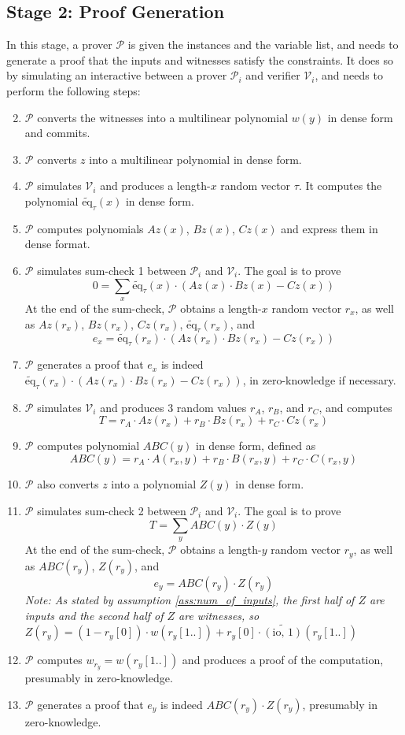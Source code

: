 \documentclass{article}
\renewcommand{\P}{\mathcal{P}}
\newcommand{\V}{\mathcal{V}}
\newcommand{\eq}{\widetilde{\mbox{eq}}}
\newcommand{\io}{\widetilde{(\mbox{io, 1})}}
\begin{document}
\subsection{Stage 2: Proof Generation}
In this stage, a prover $\P$ is given the instances and the variable list, and needs to generate a proof that the inputs and witnesses satisfy the constraints. It does so by simulating an interactive between a prover $\P_i$ and verifier $\V_i$, and needs to perform the following steps:
\begin{enumerate}
    \setcounter{enumi}{1}
    \item $\P$ converts the witnesses into a multilinear polynomial $w(y)$ in dense form and commits.
    \item $\P$ converts $z$ into a multilinear polynomial in dense form.
    \item $\P$ simulates $\V_i$ and produces a length-$x$ random vector $\tau$. It computes the polynomial $\eq_\tau(x)$ in dense form.
    \item $\P$ computes polynomials $Az(x)$, $Bz(x)$, $Cz(x)$ and express them in dense format.
    \item $\P$ simulates sum-check 1 between $\P_i$ and $\V_i$. The goal is to prove
    $$\displaystyle0 =\sum_x \eq_\tau(x)\cdot (Az(x)\cdot Bz(x) - Cz(x))$$
    At the end of the sum-check, $\P$ obtains a length-$x$ random vector $r_x$, as well as $Az(r_x)$, $Bz(r_x)$, $Cz(r_x)$, $\eq_\tau(r_x)$, and
    $$e_x = \eq_\tau(r_x)\cdot (Az(r_x)\cdot Bz(r_x) - Cz(r_x))$$
    \item $\P$ generates a proof that $e_x$ is indeed $\eq_\tau(r_x)\cdot (Az(r_x)\cdot Bz(r_x) - Cz(r_x))$, in zero-knowledge if necessary.\label{step_spartan:p_proof_1}
    \item $\P$ simulates $\V_i$ and produces 3 random values $r_A$, $r_B$, and $r_C$, and computes 
    $$T = r_A\cdot Az(r_x) + r_B\cdot Bz(r_x) + r_C\cdot Cz(r_x)$$
    \item $\P$ computes polynomial $ABC(y)$ in dense form, defined as
    $$ABC(y) = r_A\cdot A(r_x, y) + r_B\cdot B(r_x, y) + r_C\cdot C(r_x, y)$$
    \item $\P$ also converts $z$ into a polynomial $Z(y)$ in dense form.
    \item $\P$ simulates sum-check 2 between $\P_i$ and $\V_i$. The goal is to prove
    $$\displaystyle T = \sum_y ABC(y)\cdot Z(y)$$
    At the end of the sum-check, $\P$ obtains a length-$y$ random vector $r_y$, as well as $ABC(r_y)$, $Z(r_y)$, and
    $$e_y = ABC(r_y)\cdot Z(r_y)$$
    \emph{Note: As stated by assumption \ref{ass:num_of_inputs}, the first half of $Z$ are inputs and the second half of $Z$ are witnesses, so $Z(r_y) = (1 - r_y[0])\cdot w(r_y[1..]) + r_y[0]\cdot \io(r_y[1..])$}
    \item $\P$ computes $w_{r_y} = w(r_y[1..])$ and produces a proof of the computation, presumably in zero-knowledge.\label{step_spartan:p_proof_2}
    \item $\P$ generates a proof that $e_y$ is indeed $ABC(r_y)\cdot Z(r_y)$, presumably in zero-knowledge.\label{step_spartan:p_proof_3}
\end{enumerate}
\end{document}
